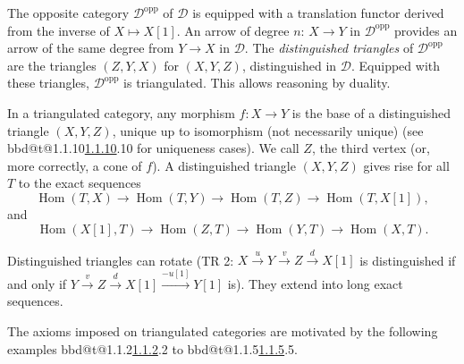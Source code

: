 \documentclass[12pt,oneside]{amsbook}
\makeatletter
\DeclareRobustCommand{\rn}[1]{%
  \ifcsname bbd@t@#1\endcsname\hyperlink{bbd:#1}{#1}\else#1\fi}
\theoremstyle{plain}
\theoremstyle{definition}
\makeatother
\begin{document}
The opposite category \( \mathcal{D}^\text{opp} \) of \( \mathcal{D} \) is equipped with a translation functor derived from the inverse of \( X \mapsto X[1] \). An arrow of degree \( n \): \( X \to Y \) in \( \mathcal{D}^\text{opp} \) provides an arrow of the same degree from \( Y \to X \) in \( \mathcal{D} \). The \emph{distinguished triangles} of \( \mathcal{D}^\text{opp} \) are the triangles \( (Z, Y, X) \) for \( (X, Y, Z) \), distinguished in \( \mathcal{D} \). Equipped with these triangles, \( \mathcal{D}^\text{opp} \) is triangulated. This allows reasoning by duality.

In a triangulated category, any morphism \( f: X \to Y \) is the base of a distinguished triangle \( (X, Y, Z) \), unique up to isomorphism (not necessarily unique) (see \rn{1.1.10} for uniqueness cases). We call \( Z \), the third vertex (or, more correctly, a cone of \( f \)). A distinguished triangle \( (X, Y, Z) \) gives rise for all \( T \) to the exact sequences
\[
\operatorname{Hom}(T, X) \to \operatorname{Hom}(T, Y) \to \operatorname{Hom}(T, Z) \to \operatorname{Hom}(T, X[1]),
\]
and
\[
\operatorname{Hom}(X[1], T) \to \operatorname{Hom}(Z, T) \to \operatorname{Hom}(Y, T) \to \operatorname{Hom}(X, T).
\]

Distinguished triangles can rotate (TR 2: \( X \overset{u}\to Y \overset{v}\to Z \overset{d}\to X[1] \) is distinguished if and only if \( Y \overset{v}\to Z \overset{d}\to X[1] \overset{-u[1]}\to Y[1] \) is). They extend into long exact sequences.

The axioms imposed on triangulated categories are motivated by the following examples \rn{1.1.2} to \rn{1.1.5}.
\end{document}
